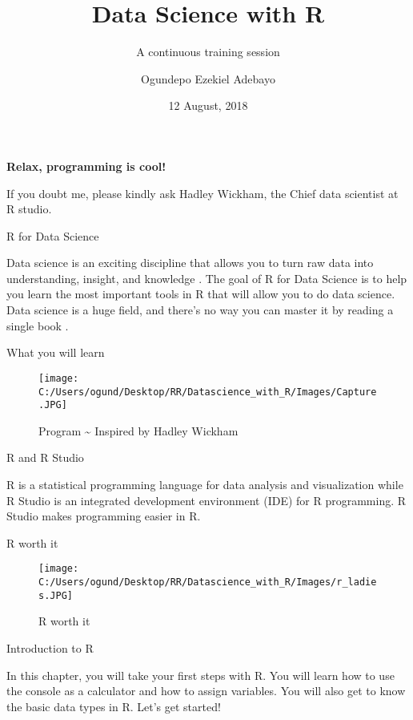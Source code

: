 \documentclass[ignorenonframetext,]{beamer}
\title{Data Science with R}
\subtitle{A continuous training session}
\author{Ogundepo Ezekiel Adebayo}
\date{12 August, 2018}
\begin{document}
\frame{\titlepage}

\begin{frame}

\begin{center}
\textbf{Relax, programming is cool!}
\end{center}

If you doubt me, please kindly ask Hadley Wickham, the Chief data
scientist at R studio.

\end{frame}

\begin{frame}{R for Data Science}

Data science is an exciting discipline that allows you to turn raw data
into understanding, insight, and knowledge \cite{P}. The goal of R for
Data Science is to help you learn the most important tools in R that
will allow you to do data science. Data science is a huge field, and
there's no way you can master it by reading a single book \cite{P}.

\end{frame}

\begin{frame}{What you will learn}

\begin{figure}
\centering
\texttt{[image: C:/Users/ogund/Desktop/RR/Datascience\_with\_R/Images/Capture.JPG]}
\caption{Program \textasciitilde{} Inspired by Hadley Wickham \cite{P}}
\end{figure}

\begin{block}{R and R Studio}

R is a statistical programming language for data analysis and
visualization while R Studio is an integrated development environment
(IDE) for R programming. R Studio makes programming easier in R.

\end{block}

\end{frame}

\begin{frame}{R worth it}

\begin{figure}
\centering
\texttt{[image: C:/Users/ogund/Desktop/RR/Datascience\_with\_R/Images/r\_ladies.JPG]}
\caption{R worth it}
\end{figure}

\end{frame}

\begin{frame}{Introduction to R}

In this chapter, you will take your first steps with R. You will learn
how to use the console as a calculator and how to assign variables. You
will also get to know the basic data types in R. Let's get started!

\end{frame}
\end{document}
